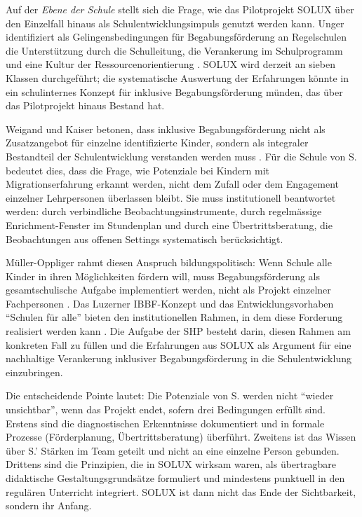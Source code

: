 \documentclass[ngerman, a4paper]{article}
\begin{document}
Auf der \textit{Ebene der Schule} stellt sich die Frage, wie das
Pilotprojekt SOLUX über den Einzelfall hinaus als Schulentwicklungsimpuls
genutzt werden kann. Unger identifiziert als Gelingensbedingungen für
Begabungsförderung an Regelschulen die Unterstützung durch die Schulleitung,
die Verankerung im Schulprogramm und eine Kultur der Ressourcenorientierung
\parencite{unger2010begabungsfoerderung}. SOLUX wird derzeit an sieben
Klassen durchgeführt; die systematische Auswertung der Erfahrungen könnte
in ein schulinternes Konzept für inklusive Begabungsförderung münden, das
über das Pilotprojekt hinaus Bestand hat.

Weigand und Kaiser betonen, dass inklusive Begabungsförderung nicht als
Zusatzangebot für einzelne identifizierte Kinder, sondern als integraler
Bestandteil der Schulentwicklung verstanden werden muss
\parencite{weigand2021separativ}. Für die Schule von S. bedeutet dies,
dass die Frage, wie Potenziale bei Kindern mit Migrationserfahrung erkannt
werden, nicht dem Zufall oder dem Engagement einzelner Lehrpersonen
überlassen bleibt. Sie muss institutionell beantwortet werden: durch
verbindliche Beobachtungsinstrumente, durch regelmässige Enrichment-Fenster
im Stundenplan und durch eine Übertrittsberatung, die Beobachtungen aus
offenen Settings systematisch berücksichtigt.

Müller-Oppliger rahmt diesen Anspruch bildungspolitisch: Wenn Schule alle
Kinder in ihren Möglichkeiten fördern will, muss Begabungsförderung als
gesamtschulische Aufgabe implementiert werden, nicht als Projekt einzelner
Fachpersonen \parencite{muelleroppliger2021plurale}. Das Luzerner
IBBF-Konzept und das Entwicklungsvorhaben \enquote{Schulen für alle} bieten
den institutionellen Rahmen, in dem diese Forderung realisiert werden kann
\parencite{dvs2025bbf}. Die Aufgabe der SHP besteht darin, diesen Rahmen
am konkreten Fall zu füllen und die Erfahrungen aus SOLUX als Argument für
eine nachhaltige Verankerung inklusiver Begabungsförderung in die
Schulentwicklung einzubringen.

Die entscheidende Pointe lautet: Die Potenziale von S. werden nicht
\enquote{wieder unsichtbar}, wenn das Projekt endet, sofern drei Bedingungen
erfüllt sind. Erstens sind die diagnostischen Erkenntnisse dokumentiert und
in formale Prozesse (Förderplanung, Übertrittsberatung) überführt. Zweitens
ist das Wissen über S.' Stärken im Team geteilt und nicht an eine einzelne
Person gebunden. Drittens sind die Prinzipien, die in SOLUX wirksam waren,
als übertragbare didaktische Gestaltungsgrundsätze formuliert und mindestens
punktuell in den regulären Unterricht integriert. SOLUX ist dann nicht das
Ende der Sichtbarkeit, sondern ihr Anfang.
\end{document}
